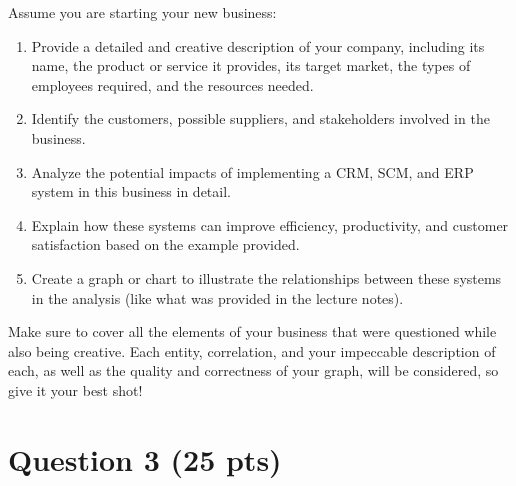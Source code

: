 \begin{question}
	Assume you are starting your new business:
	\begin{enumerate}
		\item Provide a detailed and creative description of your company, including its name, the product or service it provides, its target market, the types of employees required, and the resources needed.
		\item Identify the customers, possible suppliers, and stakeholders involved in the business.
		\item Analyze the potential impacts of implementing a CRM, SCM, and ERP system in this business in detail.
		\item Explain how these systems can improve efficiency, productivity, and customer satisfaction based on the example provided.
		\item Create a graph or chart to illustrate the relationships between these systems in the analysis (like what was provided in the lecture notes).
	\end{enumerate}

	Make sure to cover all the elements of your business that were questioned while also being creative. Each entity, correlation, and your impeccable description of each, as well as the quality and correctness of your graph, will be considered, so give it your best shot!
\end{question}

\pagebreak
\begin{answer}
	
\end{answer}

\pagebreak
\section{Question 3 \normalsize(25 pts)}

